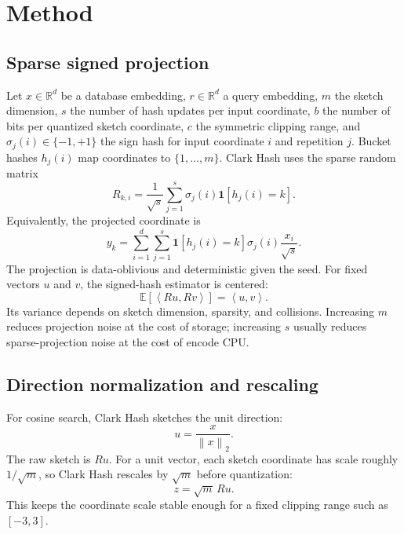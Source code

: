 \documentclass[11pt]{article}
\newcommand{\R}{\mathbb{R}}
\newcommand{\E}{\mathbb{E}}
\newcommand{\norm}[1]{\left\lVert #1 \right\rVert_2}
\newcommand{\inner}[2]{\left\langle #1, #2 \right\rangle}
\begin{document}
\section{Method}

\subsection{Sparse signed projection}

Let $x \in \R^d$ be a database embedding, $r \in \R^d$ a query embedding, $m$
the sketch dimension, $s$ the number of hash updates per input coordinate, $b$
the number of bits per quantized sketch coordinate, $c$ the symmetric clipping
range, and $\sigma_j(i) \in \{-1,+1\}$ the sign hash for input coordinate $i$
and repetition $j$. Bucket hashes $h_j(i)$ map coordinates to
$\{1,\ldots,m\}$. Clark Hash uses the sparse random matrix
\begin{equation}
R_{k,i} = \frac{1}{\sqrt{s}} \sum_{j=1}^{s} \sigma_j(i) \mathbf{1}[h_j(i)=k].
\end{equation}
Equivalently, the projected coordinate is
\begin{equation}
y_k = \sum_{i=1}^{d} \sum_{j=1}^{s}
      \mathbf{1}[h_j(i)=k] \sigma_j(i) \frac{x_i}{\sqrt{s}}.
\end{equation}
The projection is data-oblivious and deterministic given the seed. For fixed
vectors $u$ and $v$, the signed-hash estimator is centered:
\begin{equation}
\E[\inner{Ru}{Rv}] = \inner{u}{v}.
\end{equation}
Its variance depends on sketch dimension, sparsity, and collisions. Increasing
$m$ reduces projection noise at the cost of storage; increasing $s$ usually
reduces sparse-projection noise at the cost of encode CPU.

\subsection{Direction normalization and rescaling}

For cosine search, Clark Hash sketches the unit direction:
\begin{equation}
u = \frac{x}{\norm{x}}.
\end{equation}
The raw sketch is $Ru$. For a unit vector, each sketch coordinate has scale
roughly $1/\sqrt{m}$, so Clark Hash rescales by $\sqrt{m}$ before quantization:
\begin{equation}
z = \sqrt{m}\,Ru.
\end{equation}
This keeps the coordinate scale stable enough for a fixed clipping range such as
$[-3,3]$.
\end{document}
